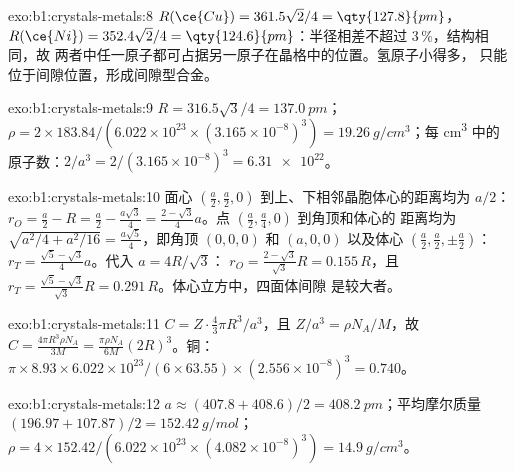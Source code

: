 \begin{solution}{exo:b1:crystals-metals:8}
$R(\ce{Cu}) = 361.5\sqrt2/4 = \qty{127.8}{pm}$，$R(\ce{Ni}) = 352.4\sqrt2/4
= \qty{124.6}{pm}$：半径相差不超过 3\,\%，结构相同，故
两者中任一原子都可占据另一原子在晶格中的位置。氢原子小得多，
只能位于间隙位置，形成间隙型合金。
\end{solution}

\begin{solution}{exo:b1:crystals-metals:9}
$R = 316.5\sqrt3/4 = \qty{137.0}{pm}$；$\rho = 2 \times 183.84/(6.022 \times
10^{23} \times (3.165 \times 10^{-8})^3) = \qty{19.26}{g/cm^3}$；每
\unit{cm^3} 中的原子数：$2/a^3 = 2/(3.165 \times 10^{-8})^3 = \num{6.31e22}$。
\end{solution}

\begin{solution}{exo:b1:crystals-metals:10}
面心 $(\frac a2,\frac a2,0)$ 到上、下相邻晶胞体心的距离均为 $a/2$：
$r_O = \frac a2 - R = \frac a2 - \frac{a\sqrt3}{4}
= \frac{2-\sqrt3}{4}a$。点 $(\frac a2,\frac a4,0)$ 到角顶和体心的
距离均为 $\sqrt{a^2/4 + a^2/16} = \frac{a\sqrt5}{4}$，即角顶 $(0,0,0)$ 和
$(a,0,0)$ 以及体心 $(\frac a2,\frac a2,\pm\frac a2)$：
$r_T = \frac{\sqrt5 - \sqrt3}{4}a$。代入 $a = 4R/\sqrt3$：
$r_O = \frac{2-\sqrt3}{\sqrt3}R = 0.155\,R$，且
$r_T = \frac{\sqrt5-\sqrt3}{\sqrt3}R = 0.291\,R$。体心立方中，四面体间隙
是较大者。
\end{solution}

\begin{solution}{exo:b1:crystals-metals:11}
$C = Z\cdot\frac43\pi R^3/a^3$，且 $Z/a^3 = \rho N_A/M$，故 $C =
\frac{4\pi R^3\rho N_A}{3M} = \frac{\pi\rho N_A}{6M}(2R)^3$。铜：
$\pi \times 8.93 \times 6.022 \times 10^{23}/(6 \times 63.55) \times (2.556
\times 10^{-8})^3 = 0.740$。
\end{solution}

\begin{solution}{exo:b1:crystals-metals:12}
$a \approx (407.8 + 408.6)/2 = \qty{408.2}{pm}$；平均摩尔质量 $(196.97 +
107.87)/2 = \qty{152.42}{g/mol}$；$\rho = 4 \times 152.42/(6.022 \times
10^{23} \times (4.082 \times 10^{-8})^3) = \qty{14.9}{g/cm^3}$。
\end{solution}

